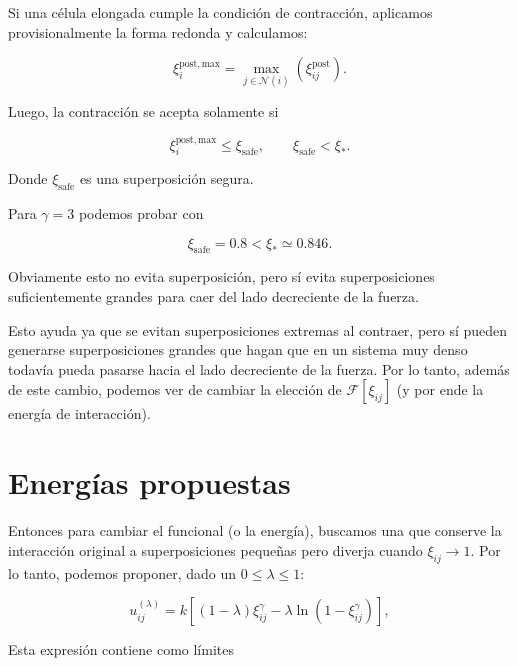 \documentclass[11pt,a4paper]{article}
\begin{document}
Si una célula elongada cumple la condición de contracción, aplicamos provisionalmente la forma redonda y calculamos:

\begin{equation}
\xi_{i}^{\mathrm{post,max}}
=
\max_{j\in\mathcal N(i)}
\left(
\xi_{ij}^{\mathrm{post}}
\right).
\end{equation}

Luego, la contracción se acepta solamente si

\begin{equation}
\boxed{
\xi_{i}^{\mathrm{post,max}}
\leq
\xi_{\mathrm{safe}}
},
\qquad
\xi_{\mathrm{safe}}<\xi_*.
\label{eq:contraction_condition}
\end{equation}

Donde $\xi_{\mathrm{safe}}$ es una superposición segura.

Para $\gamma=3$ podemos probar con

\begin{equation}
\xi_{\mathrm{safe}}=0.8
<
\xi_*
\simeq0.846.
\end{equation}

Obviamente esto no evita superposición, pero sí evita superposiciones suficientemente grandes para caer del lado decreciente de la fuerza.

Esto ayuda ya que se evitan superposiciones extremas al contraer, pero sí pueden generarse superposiciones grandes que hagan que en un sistema muy denso todavía pueda pasarse hacia el lado decreciente de la fuerza. Por lo tanto, además de este cambio, podemos ver de cambiar la elección de $\mathcal{F}[\xi_{ij}]$ (y por ende la energía de interacción).

\section{Energías propuestas}

Entonces para cambiar el funcional (o la energía), buscamos una que conserve la interacción original a superposiciones pequeñas pero diverja cuando $\xi_{ij}\rightarrow 1$. Por lo tanto, podemos proponer, dado un $0\leq\lambda\leq1$:

\begin{equation}
\boxed{
u_{ij}^{(\lambda)}
=
k\left[
(1-\lambda)\xi_{ij}^{\gamma}
-
\lambda\ln\left(1-\xi_{ij}^{\gamma}\right)
\right]
},
\label{eq:regularized_energy}
\end{equation}

Esta expresión contiene como límites
\end{document}
